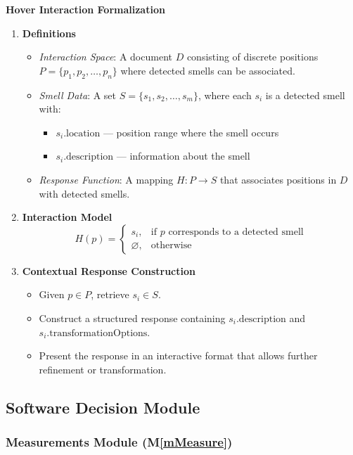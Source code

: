 \documentclass[12pt, titlepage]{article}
\newcommand{\mref}[1]{M\ref{#1}}
\begin{document}
\textbf{Hover Interaction Formalization}
\begin{enumerate}
  \item \textbf{Definitions}
  \begin{itemize}
      \item \textit{Interaction Space}: A document \( D \) consisting of discrete positions \( P = \{ p_1, p_2, \dots, p_n \} \) where detected smells can be associated.
      \item \textit{Smell Data}: A set \( S = \{ s_1, s_2, \dots, s_m \} \), where each \( s_i \) is a detected smell with:
        \begin{itemize}
            \item \( s_i.\text{location} \) — position range where the smell occurs
            \item \( s_i.\text{description} \) — information about the smell
        \end{itemize}
      \item \textit{Response Function}: A mapping \( H: P \to S \) that associates positions in \( D \) with detected smells.
  \end{itemize}

  \item \textbf{Interaction Model}
  \[
  H(p) =
  \begin{cases} 
      s_i, & \text{if } p \text{ corresponds to a detected smell} \\
      \varnothing, & \text{otherwise}
  \end{cases}
  \]

  \item \textbf{Contextual Response Construction}
  \begin{itemize}
      \item Given \( p \in P \), retrieve \( s_i \in S \).
      \item Construct a structured response containing \( s_i.\text{description} \) and \( s_i.\text{transformationOptions} \).
      \item Present the response in an interactive format that allows further refinement or transformation.
  \end{itemize}
\end{enumerate}

\subsection{Software Decision Module}

\subsubsection{Measurements Module (\mref{mMeasure})}
\end{document}
